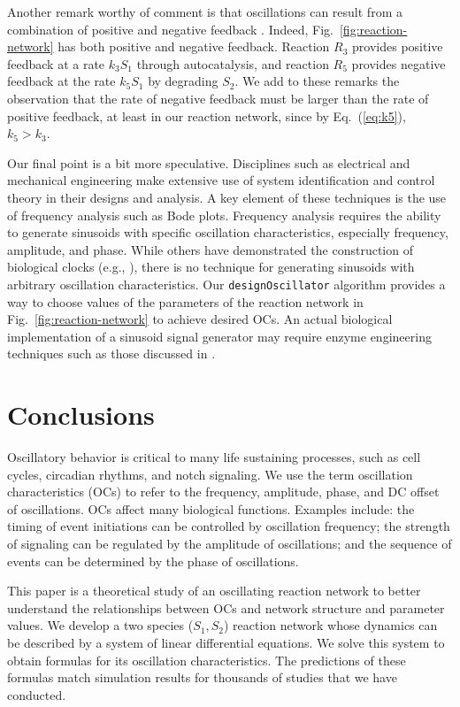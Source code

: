 \documentclass{bmcart}
\newcommand{\eqn}[1]{Eq.~(\ref{#1})}
\newcommand{\fig}[1]{Fig.~\ref{#1}}
\begin{document}
Another remark worthy of comment is that oscillations can result from a combination of positive and negative feedback \cite{Novak2008}.  Indeed, \fig{fig:reaction-network} has both positive and negative feedback. Reaction $R_3$ provides positive feedback at a rate $k_3 S_1$ through autocatalysis, and reaction $R_5$ provides negative feedback at the rate $k_5 S_1$ by degrading $S_2$. We add to these remarks the observation that the rate of negative feedback must be larger than the rate of positive feedback, at least in our reaction network, since by \eqn{eq:k5}, $k_5 > k_3 .$

Our final point is a bit more speculative. Disciplines such as electrical and mechanical engineering make extensive use of system identification and control theory in their designs and analysis. A key element of these techniques is the use of frequency analysis such as Bode plots. Frequency analysis requires the ability to generate sinusoids with specific oscillation characteristics, especially frequency, amplitude, and phase. While others have demonstrated the construction of biological clocks (e.g., \cite{chuang_synthesizing_2014, chavan_reconstitution_2021}), there is no technique for generating sinusoids with arbitrary oscillation characteristics. Our {\tt designOscillator} algorithm provides a way to choose values of the parameters of the reaction network in \fig{fig:reaction-network} to achieve desired OCs. An actual biological implementation of a sinusoid signal generator may require enzyme engineering techniques such as those discussed in \cite{novichkov_autocatalytic_2021}.

\section*{Conclusions}
Oscillatory behavior is critical to many life sustaining processes, such as cell cycles, circadian rhythms, and notch signaling. We use the term oscillation characteristics (OCs) to refer to the frequency, amplitude, phase, and DC offset of oscillations. OCs affect many biological functions. Examples include: the timing of event initiations can be controlled by oscillation frequency; the strength of signaling can be regulated by the amplitude of oscillations; and the sequence of events can be determined by the phase of oscillations.

This paper is a theoretical study of an oscillating reaction network to better understand the relationships between OCs and network structure and parameter values. We develop a two species ($S_1, S_2$) reaction network whose dynamics can be described by a system of linear differential equations. We solve this system to obtain formulas for its oscillation characteristics. The predictions of these formulas match simulation results for thousands of studies that we have conducted.
\end{document}
